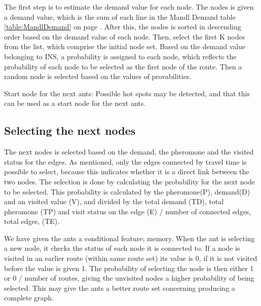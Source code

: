 The first step is to estimate the demand value for each node. The nodes is given a demand value, which is the sum of each line in the Mandl Demand table \ref{table:MandlDemand} on page \pageref{table:MandlDemand}.
After this, the nodes is sorted in descending order based on the demand value of each node.
Then, select the first K nodes from the list, which comprise the initial node set. Based on the demand value belonging to INS, a probability is assigned to each node, which reflects the probability of each node to be selected as the first node of the route. Then a random node is selected based on the values of provabilities. 

Start node for the next ants: Possible hot spots may be detected, and that this can be used as a start node for the next ants. 

\subsection{Selecting the next nodes}




\begin{algorithm}[H]
\end{algorithm}

The next nodes is selected based on the demand, the pheromone and the visited status for the edges. As mentioned, only the edges connected by travel time is possible to select, because this indicates whether it is a direct link between the two nodes. The selection is done by calculating the probability for the next node to be selected. This probability is calculated by the pheromone(P), demand(D) and an visited value (V), and divided by the total demand (TD), total pheromone (TP) and visit status on the edge (E) / number of connected edges, total edges, (TE).

We have given the ants a conditional feature; memory. When the ant is selecting a new node, it checks the status of each node it is connected to. If a node is visited in an earlier route (within same route set) its value is 0, if it is not visited before the value is given 1. The probability of selecting the node is then either 1 or 0 / number of routes, giving the unvisited nodes a higher probability of being selected. This may give the ants a better route set concerning producing a complete graph.

